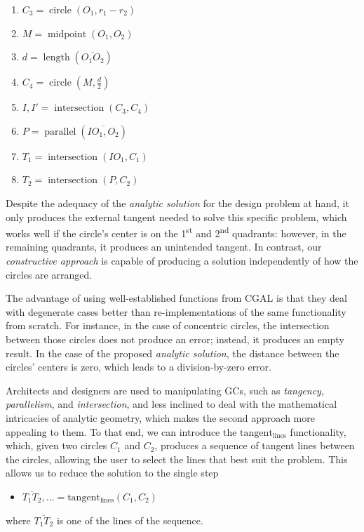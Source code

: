\begin{enumerate}
  \item $C_3 = \operatorname{circle}\left(O_1, r_1 - r_2\right)$
  \item $M = \operatorname{midpoint}\left(O_1, O_2\right)$
  \item $d = \operatorname{length}\left(\overline{O_1 O_2}\right)$
  \item $C_4 = \operatorname{circle}\left(M, \frac{d}{2}\right)$
  \item $I,I' = \operatorname{intersection}\left(C_3, C_4\right)$
  \item $P = \operatorname{parallel}\left(\overline{IO_1, O_2}\right)$
  \item $T_1 = \operatorname{intersection}\left(IO_1, C_1\right)$
  \item $T_2 = \operatorname{intersection}\left(P, C_2\right)$
\end{enumerate}

Despite the adequacy of the \textit{analytic solution} for the design problem at
hand, it only produces the external tangent needed to solve this specific
problem, which works well if the circle's center is on the 1\textsuperscript{st}
and 2\textsuperscript{nd} quadrants: however, in the remaining quadrants, it
produces an unintended tangent.  In contrast, our \textit{constructive approach}
is capable of producing a solution independently of how the circles are
arranged.

The advantage of using well-established functions from \ac{CGAL} is that they
deal with degenerate cases better than re-implementations of the same
functionality from scratch.  For instance, in the case of concentric circles,
the intersection between those circles does not produce an error; instead, it
produces an empty result.  In the case of the proposed \textit{analytic
solution}, the distance between the circles' centers is zero, which leads to a
division-by-zero error.

Architects and designers are used to manipulating \acp{GC}, such as
\textit{tangency}, \textit{parallelism}, and \textit{intersection}, and less
inclined to deal with the mathematical intricacies of analytic geometry, which
makes the second approach more appealing to them.  To that end, we can introduce
the $\operatorname{tangent_{lines}}$ functionality, which, given two circles
$C_1$ and $C_2$, produces a sequence of tangent lines between the circles,
allowing the user to select the lines that best suit the problem.  This allows
us to reduce the solution to the single step
\begin{itemize}
  \item[] $\overline{T_1 T_2},\ldots = \operatorname{tangent_{lines}}\left(C_1,
  C_2\right)$
\end{itemize}
where $\overline{T_1 T_2}$ is one of the lines of the sequence.


